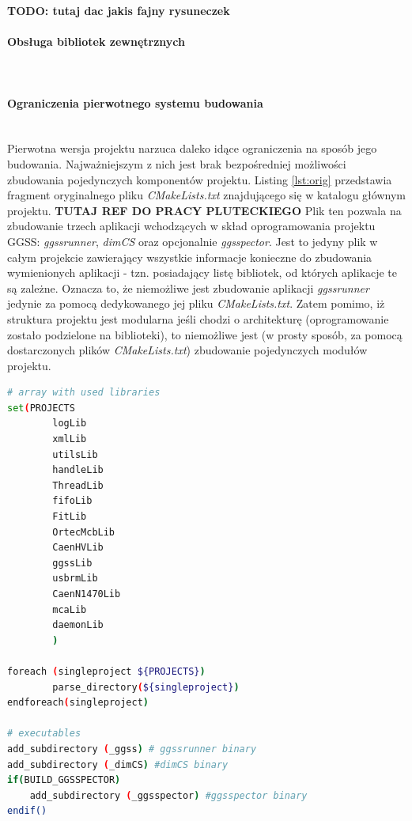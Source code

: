 \textbf{TODO: tutaj dac jakis fajny rysuneczek}












\paragraph*{Obsługa bibliotek zewnętrznych}\mbox{}\\



\paragraph*{Ograniczenia pierwotnego systemu budowania}\mbox{}\\
Pierwotna wersja projektu narzuca daleko idące ograniczenia na sposób jego budowania. Najważniejszym z nich jest brak bezpośredniej możliwości zbudowania pojedynczych komponentów projektu. Listing \ref{lst:orig} przedstawia fragment oryginalnego pliku \textit{CMakeLists.txt} znajdującego się w katalogu głównym projektu. \textbf{TUTAJ REF DO PRACY PLUTECKIEGO} Plik ten pozwala na zbudowanie trzech aplikacji wchodzących w skład oprogramowania projektu GGSS: \textit{ggssrunner}, \textit{dimCS} oraz opcjonalnie \textit{ggsspector}. Jest to jedyny plik w całym projekcie zawierający wszystkie informacje konieczne do zbudowania wymienionych aplikacji - tzn. posiadający listę bibliotek, od których aplikacje te są zależne. Oznacza to, że niemożliwe jest zbudowanie aplikacji \textit{ggssrunner} jedynie za pomocą dedykowanego jej pliku \textit{CMakeLists.txt}. Zatem pomimo, iż struktura projektu jest modularna jeśli chodzi o architekturę (oprogramowanie zostało podzielone na biblioteki), to niemożliwe jest (w prosty sposób, za pomocą dostarczonych plików \textit{CMakeLists.txt}) zbudowanie pojedynczych modułów projektu.

\begin{lstlisting}[language=bash, caption={Fragment oryginalnego pliku CMakeLists.txt znajdującego się w katalogu głównym pierwotnej wersji projektu}, label={lst:orig}]
# array with used libraries
set(PROJECTS
        logLib
        xmlLib
        utilsLib
        handleLib
        ThreadLib
        fifoLib
        FitLib
        OrtecMcbLib
        CaenHVLib
        ggssLib
        usbrmLib
        CaenN1470Lib
        mcaLib
        daemonLib
        )

foreach (singleproject ${PROJECTS})
        parse_directory(${singleproject})
endforeach(singleproject)

# executables
add_subdirectory (_ggss) # ggssrunner binary
add_subdirectory (_dimCS) #dimCS binary
if(BUILD_GGSSPECTOR)
    add_subdirectory (_ggsspector) #ggsspector binary
endif()
\end{lstlisting}

